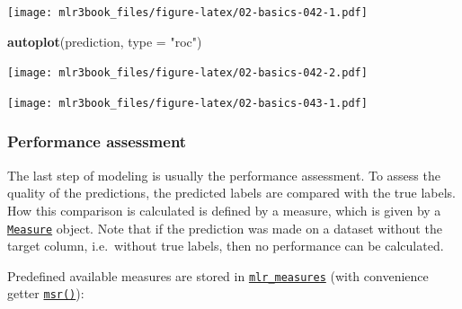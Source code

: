 \documentclass[]{article}
\newenvironment{Shaded}{\begin{snugshade}}{\end{snugshade}}
\newcommand{\CommentTok}[1]{\textcolor[rgb]{0.56,0.35,0.01}{\textit{#1}}}
\newcommand{\DataTypeTok}[1]{\textcolor[rgb]{0.13,0.29,0.53}{#1}}
\newcommand{\KeywordTok}[1]{\textcolor[rgb]{0.13,0.29,0.53}{\textbf{#1}}}
\newcommand{\NormalTok}[1]{#1}
\newcommand{\OperatorTok}[1]{\textcolor[rgb]{0.81,0.36,0.00}{\textbf{#1}}}
\newcommand{\StringTok}[1]{\textcolor[rgb]{0.31,0.60,0.02}{#1}}
\renewenvironment{Shaded} {\begin{snugshade}\small} {\end{snugshade}}
\begin{document}
\texttt{[image: mlr3book\_files/figure-latex/02-basics-042-1.pdf]}

\begin{Shaded}
\begin{Highlighting}[]
\KeywordTok{autoplot}\NormalTok{(prediction, }\DataTypeTok{type =} \StringTok{"roc"}\NormalTok{)}
\end{Highlighting}
\end{Shaded}

\texttt{[image: mlr3book\_files/figure-latex/02-basics-042-2.pdf]}

\begin{Shaded}
\end{Shaded}

\texttt{[image: mlr3book\_files/figure-latex/02-basics-043-1.pdf]}

\hypertarget{measure}{%
\subsubsection{Performance assessment}\label{measure}}

The last step of modeling is usually the performance assessment.
To assess the quality of the predictions, the predicted labels are compared with the true labels.
How this comparison is calculated is defined by a measure, which is given by a \href{https://mlr3.mlr-org.com/reference/Measure.html}{\texttt{Measure}} object.
Note that if the prediction was made on a dataset without the target column, i.e.~without true labels, then no performance can be calculated.

Predefined available measures are stored in \href{https://mlr3.mlr-org.com/reference/mlr_measures.html}{\texttt{mlr\_measures}} (with convenience getter \href{https://mlr3.mlr-org.com/reference/mlr_sugar.html}{\texttt{msr()}}):
\end{document}
